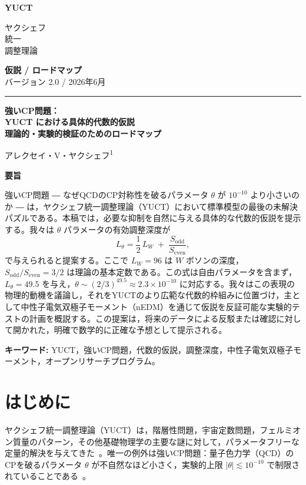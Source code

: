 \documentclass[11pt,a4paper]{article}
\newcommand{\makeheader}{%
	\noindent
	\begin{minipage}{0.17\textwidth}
		\raggedright
		{\sffamily\bfseries\color{skyblue}\fontsize{46}{46}\selectfont YUCT}%
	\end{minipage}%
	\hspace{30pt}
	\begin{minipage}{0.32\textwidth}
		\raggedright
		{\sffamily\fontsize{11}{13}\selectfont ヤクシェフ\\ 統一\\ 調整理論}%
	\end{minipage}%
	\hfill
	\begin{minipage}{0.38\textwidth}
		\raggedleft
		{\sffamily\bfseries 仮説 / ロードマップ}\\ 
		{\sffamily バージョン 2.0 / 2026年6月}\\ 
	\end{minipage}
	\par\vspace{5pt}
	\noindent\textcolor{gold}{\rule{\textwidth}{1.6pt}}
	\par\vspace{0pt}
}
\begin{document}
	\thispagestyle{firstpage}
	\makeheader
	
	\vspace{0cm}
	{\LARGE\bfseries 強いCP問題：\\[0.1cm] YUCT における具体的代数的仮説\\[0.2cm] \Large 理論的・実験的検証のためのロードマップ \par}
	\vspace{0.2cm}
	
	{\large アレクセイ・V・ヤクシェフ\textsuperscript{1}} \\
	\vspace{0.0cm}
	
	{\color{darkblue}\textbf{\LARGE 要旨}} \par
	{\large
		\noindent
		強いCP問題 ― なぜQCDのCP対称性を破るパラメータ \(\theta\) が \(10^{-10}\) より小さいのか ― は，ヤクシェフ統一調整理論（YUCT）において標準模型の最後の未解決パズルである。本稿では，必要な抑制を自然に与える具体的な代数的仮説を提示する。我々は \(\theta\) パラメータの有効調整深度が
		\[
		L_\theta = \frac{1}{2}\,L_W \;+\; \frac{S_{\mathrm{odd}}}{S_{\mathrm{even}}},
		\]
		で与えられると提案する。ここで \(L_W = 96\) は \(W\) ボソンの深度，\(S_{\mathrm{odd}}/S_{\mathrm{even}} = 3/2\) は理論の基本定数である。この式は自由パラメータを含まず，\(L_\theta = 49.5\) を与え，\(\theta \sim (2/3)^{49.5} \approx 2.3 \times 10^{-10}\) に対応する。我々はこの表現の物理的動機を議論し，それをYUCTのより広範な代数的枠組みに位置づけ，主として中性子電気双極子モーメント（nEDM）を通じて仮説を反証可能な実験的テストの計画を概説する。この提案は，将来のデータによる反駁または確認に対して開かれた，明確で数学的に正確な予想として提示される。
	}
	
	\vspace{0.1cm}
	\noindent
	{\color{darkblue}\textbf{キーワード:}} YUCT，強いCP問題，代数的仮説，調整深度，中性子電気双極子モーメント，オープンリサーチプログラム。
	\vspace{0.4cm}
	
	\clearpage
	\tableofcontents
	\newpage
	
	\section{はじめに}
	\label{sec:intro}
	
	ヤクシェフ統一調整理論（YUCT）は，階層性問題，宇宙定数問題，フェルミオン質量のパターン，その他基礎物理学の主要な謎に対して，パラメータフリーな定量的解決を与えてきた~\cite{Y1,Y3,Y4}。唯一の例外は強いCP問題：量子色力学（QCD）のCPを破るパラメータ \(\theta\) が不自然なほど小さく，実験的上限 \(|\theta| \lesssim 10^{-10}\) で制限されていることである~\cite{nEDM2020}。
	
\end{document}
